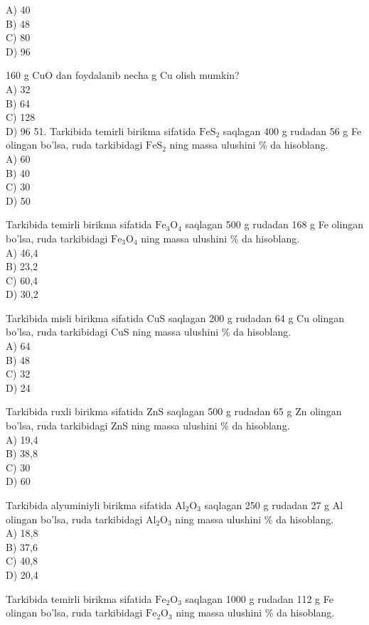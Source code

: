 A) 40\\
B) 48\\
C) 80\\
D) 96
  \item 160 g CuO dan foydalanib necha g Cu olish mumkin?\\
A) 32\\
B) 64\\
C) 128\\
D) 96
51. Tarkibida temirli birikma sifatida $\mathrm{FeS}_{2}$ saqlagan 400 g rudadan 56 g Fe olingan bo'lsa, ruda tarkibidagi $\mathrm{FeS}_{2}$ ning massa ulushini \% da hisoblang.\\
A) 60\\
B) 40\\
C) 30\\
D) 50
  \item Tarkibida temirli birikma sifatida $\mathrm{Fe}_{3} \mathrm{O}_{4}$ saqlagan 500 g rudadan 168 g Fe olingan bo'lsa, ruda tarkibidagi $\mathrm{Fe}_{3} \mathrm{O}_{4}$ ning massa ulushini \% da hisoblang.\\
A) 46,4\\
B) 23,2\\
C) 60,4\\
D) 30,2
  \item Tarkibida misli birikma sifatida CuS saqlagan 200 g rudadan 64 g Cu olingan bo'lsa, ruda tarkibidagi CuS ning massa ulushini \% da hisoblang.\\
A) 64\\
B) 48\\
C) 32\\
D) 24
  \item Tarkibida ruxli birikma sifatida ZnS saqlagan 500 g rudadan 65 g Zn olingan bo'lsa, ruda tarkibidagi ZnS ning massa ulushini \% da hisoblang.\\
A) 19,4\\
B) 38,8\\
C) 30\\
D) 60
  \item Tarkibida alyuminiyli birikma sifatida $\mathrm{Al}_{2} \mathrm{O}_{3}$ saqlagan 250 g rudadan 27 g Al olingan bo'lsa, ruda tarkibidagi $\mathrm{Al}_{2} \mathrm{O}_{3}$ ning massa ulushini \% da hisoblang.\\
A) 18,8\\
B) 37,6\\
C) 40,8\\
D) 20,4
  \item Tarkibida temirli birikma sifatida $\mathrm{Fe}_{2} \mathrm{O}_{3}$ saqlagan 1000 g rudadan 112 g Fe olingan bo'lsa, ruda tarkibidagi $\mathrm{Fe}_{2} \mathrm{O}_{3}$ ning massa ulushini \% da hisoblang.\\

